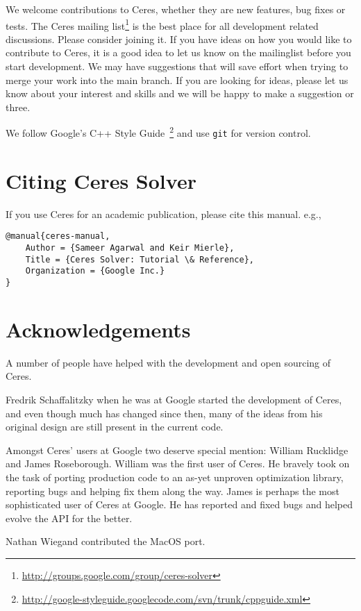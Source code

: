 We welcome contributions to Ceres, whether they are new features, bug fixes or tests. The Ceres mailing list\footnote{\url{http://groups.google.com/group/ceres-solver}} is the best place for all development related discussions. Please consider joining it. If you have ideas on how you would like to contribute to Ceres, it is a good idea to let us know on the mailinglist before you start development. We may have suggestions that will save effort when trying to merge your work into the main branch. If you are looking for ideas, please let us know about your interest and skills and we will be happy to make a suggestion or three.

We follow Google's C++ Style Guide~\footnote{\url{http://google-styleguide.googlecode.com/svn/trunk/cppguide.xml}} and use \texttt{git} for version control.

\section{Citing Ceres Solver}
If you use Ceres for an academic publication, please cite this manual. e.g.,
\begin{verbatim}
@manual{ceres-manual,
	Author = {Sameer Agarwal and Keir Mierle},
	Title = {Ceres Solver: Tutorial \& Reference},
	Organization = {Google Inc.}
}
\end{verbatim}
	

\section{Acknowledgements}
A number of people have helped with the development and open sourcing of Ceres. 

Fredrik Schaffalitzky when he was at Google started the development of Ceres, and even though much has changed since then, many of the ideas from his original design are still present in the current code.

Amongst Ceres' users at Google two deserve special mention: William Rucklidge and James Roseborough. William was the first user of Ceres. He bravely took on the task of porting production code to an as-yet unproven optimization library, reporting bugs and helping fix them along the way. James is perhaps the most sophisticated user of Ceres at Google. He has reported and fixed bugs and helped evolve the API for the better.

Nathan Wiegand contributed the MacOS port.


